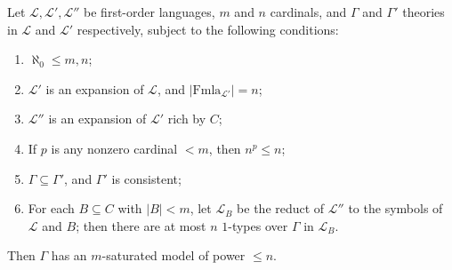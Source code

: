 \begin{theorem}[28.6]
\label{thm:existence-of-m-saturated}
Let $\mathcal{L}, \mathcal{L}', \mathcal{L}''$ be first-order languages, $m$ and $n$ cardinals, and $\Gamma$ and $\Gamma'$ theories in $\mathcal{L}$ and $\mathcal{L}'$ respectively, subject to the following conditions:
\begin{enumerate}
\item[(i)] $\aleph_0 \leq m, n$;
\item[(ii)] $\mathcal{L}'$ is an expansion of $\mathcal{L}$, and $|\mathrm{Fmla}_{\mathcal{L}'}| = n$;
\item[(iii)] $\mathcal{L}''$ is an expansion of $\mathcal{L}'$ rich by $C$;
\item[(iv)] If $p$ is any nonzero cardinal $< m$, then $n^p \leq n$;
\item[(v)] $\Gamma \subseteq \Gamma'$, and $\Gamma'$ is consistent;
\item[(vi)] For each $B \subseteq C$ with $|B| < m$, let $\mathcal{L}_B$ be the reduct of $\mathcal{L}''$ to the symbols of $\mathcal{L}$ and $B$; then there are at most $n$ $1$-types over $\Gamma$ in $\mathcal{L}_B$.
\end{enumerate}
Then $\Gamma$ has an $m$-saturated model of power $\leq n$.
\end{theorem}
